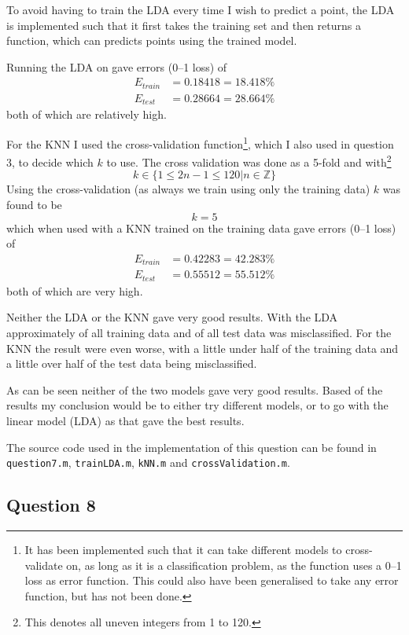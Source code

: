 \documentclass[a4paper, 11pt]{article}
\begin{document}
To avoid having to train the LDA every time I wish to predict a point, the LDA is implemented such that it first takes the training set and then returns a function, which can predicts points using the trained model.

Running the LDA on gave errors (0--1 loss) of
\begin{align*}
    E_{\mathit{train}} &= 0.18418 = 18.418 \% \\
    E_{\mathit{test}} &= 0.28664 = 28.664 \%
\end{align*}
both of which are relatively high.

For the KNN I used the cross-validation function\footnote{It has been implemented such that it can take different models to cross-validate on, as long as it is a classification problem, as the function uses a 0--1 loss as error function. This could also have been generalised to take any error function, but has not been done.}, which I also used in question 3, to decide which $k$ to use. The cross validation was done as a 5-fold and with\footnote{This denotes all uneven integers from 1 to 120.}
\[
k \in \lbrace 1 \le 2n-1 \le 120 | n \in \mathbb{Z} \rbrace
\]
Using the cross-validation (as always we train using only the training data) $k$ was found to be
\[
    k = 5
\]
which when used with a KNN trained on the training data gave errors (0--1 loss) of
\begin{align*}
    E_{\mathit{train}} &= 0.42283 = 42.283 \% \\
    E_{\mathit{test}} &= 0.55512 = 55.512 \%
\end{align*}
both of which are very high.

Neither the LDA or the KNN gave very good results. With the LDA approximately  of all training data and  of all test data was misclassified. For the KNN the result were even worse, with a little under half of the training data and a little over half of the test data being misclassified.

As can be seen neither of the two models gave very good results. Based of the results my conclusion would be to either try different models, or to go with the linear model (LDA) as that gave the best results.

The source code used in the implementation of this question can be found in \texttt{question7.m}, \texttt{trainLDA.m}, \texttt{kNN.m} and \texttt{crossValidation.m}.

\subsection*{Question 8}
\end{document}
